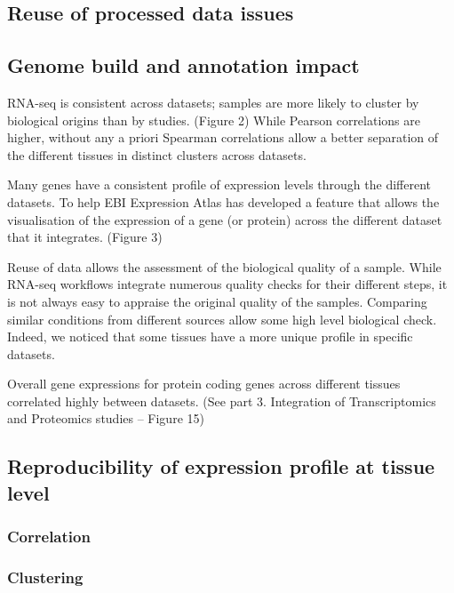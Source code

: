     \subsection{Reuse of processed data issues}\label{subsec:Trans_reuseOfData}

    \subsection{Genome build and annotation impact}\label{subsec:Trans_AnnotImpact}

RNA-seq is consistent across datasets; samples are more likely to cluster by
biological origins than by studies. (Figure 2)
While Pearson correlations are higher, without any a priori Spearman correlations
allow a better separation of the different tissues in distinct clusters across
datasets.

Many genes have a consistent profile of expression levels through the different
datasets.
To help EBI Expression Atlas has developed a feature that allows the visualisation
of the expression of a gene (or protein) across the different dataset that it
integrates. (Figure 3)

Reuse of data allows the assessment of the biological quality of a sample.
While RNA-seq workflows integrate numerous quality checks for their different steps,
it is not always easy to appraise the original quality of the samples. Comparing
similar conditions from different sources allow some high level biological check.
Indeed, we noticed that some tissues have a more unique profile in specific
datasets.

Overall gene expressions for protein coding genes across different tissues
correlated highly between datasets. (See part 3. Integration of Transcriptomics
and Proteomics studies – Figure 15)



    \subsection{Reproducibility of expression profile at tissue level}\label{subsec:Trans_ReproExpresTissue}

        \subsubsection{Correlation}\label{subsubsec:Trans_Tissue_Corr}
        \subsubsection{Clustering}\label{subsubsec:Trans_Tissue_cluster}

